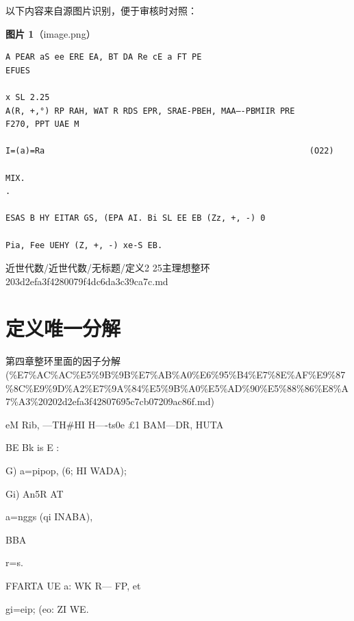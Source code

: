 \begin{note}
以下内容来自源图片识别，便于审核时对照：

\textbf{图片 1}（image.png）
\begin{Verbatim}[fontsize=\small]
A PEAR aS ee ERE EA, BT DA Re cE a FT PE
EFUES

x SL 2.25
A(R, +,°) RP RAH, WAT R RDS EPR, SRAE-PBEH, MAA—-PBMIIR PRE
F270, PPT UAE M

I=(a)=Ra                                                      (O22)

MIX.                                                                                                                               .

ESAS B HY EITAR GS, (EPA AI. Bi SL EE EB (Zz, +, -) 0

Pia, Fee UEHY (Z, +, -) xe-S EB.
\end{Verbatim}

\end{note}

\begin{note}[来源路径]

近世代数/近世代数/无标题/定义2 25主理想整环 203d2efa3f4280079f4dc6da3c39ca7c.md

\end{note}

\section*{定义唯一分解}

\begin{note}[来源上级主题]

第四章整环里面的因子分解 (\%E7\%AC\%AC\%E5\%9B\%9B\%E7\%AB\%A0\%E6\%95\%B4\%E7\%8E\%AF\%E9\%87\%8C\%E9\%9D\%A2\%E7\%9A\%84\%E5\%9B\%A0\%E5\%AD\%90\%E5\%88\%86\%E8\%A7\%A3\%20202d2efa3f42807695c7cb07209ac86f.md)

\end{note}

\begin{definition}[定义唯一分解]

eM Rib, —TH\#HI H—-ts0e £1 BAM—DR, HUTA

BE Bk is E :

G)         a=pipop, (6; HI WADA);

Gi) An5R AT

a=nggs (qi INABA),

BBA

r=s.

FFARTA UE a: WK R— FP, et

gi=eip; (eo: ZI WE.

\end{definition}

